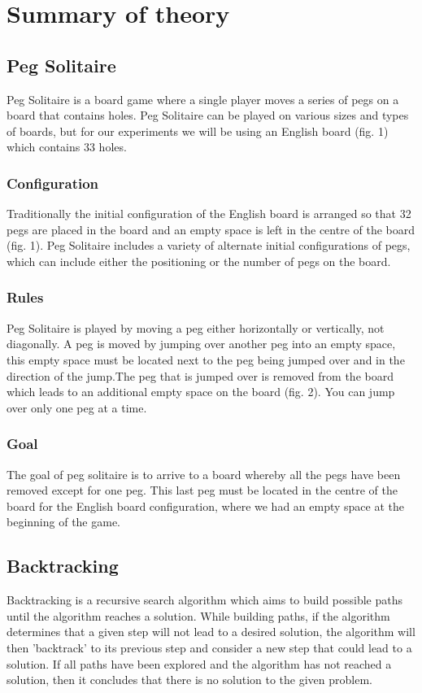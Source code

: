 \documentclass[12pt]{article}
\begin{document}
\section{Summary of theory}
\subsection{Peg Solitaire}
Peg Solitaire is a board game where a single player moves a series of pegs on a board that contains holes. Peg Solitaire can be played on various sizes and types of boards, but for our experiments we will be using an English board (fig. 1) which contains 33 holes.
\subsubsection{Configuration}
Traditionally the initial configuration of the English board is arranged so that 32 pegs are placed in the board and an empty space is left in the centre of the board (fig. 1). Peg Solitaire includes a variety of alternate initial configurations of pegs, which can include either the positioning or the number of pegs on the board.   
\subsubsection{Rules}
Peg Solitaire is played by moving a peg either horizontally or vertically, not diagonally. A peg is moved by jumping over another peg into an empty space, this empty space must be located next to the peg being jumped over and in the direction of the jump.The peg that is jumped over is removed from the board which leads to an additional empty space on the board (fig. 2). You can jump over only one peg at a time.
\subsubsection{Goal}
The goal of peg solitaire is to arrive to a board whereby all the pegs have been removed except for one peg. This last peg must be located in the centre of the board for the English board configuration, where we had an empty space at the beginning of the game.
 
\subsection{Backtracking}
Backtracking is a recursive search algorithm which aims to build possible paths until the algorithm reaches a solution. While building paths, if the algorithm determines that a given step will not lead to a desired solution, the algorithm will then 'backtrack' to its previous step and consider a new step that could lead to a solution. If all paths have been explored and the algorithm has not reached a solution, then it concludes that there is no solution to the given problem. 
\end{document}
